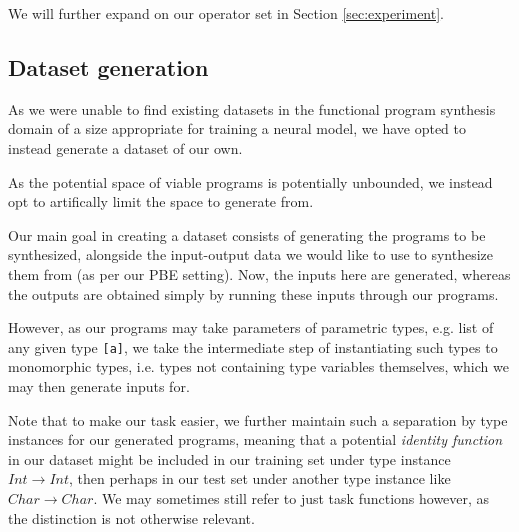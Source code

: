 \documentclass{article}
\begin{document}

We will further expand on our operator set
in Section \ref{sec:experiment}.

\subsection{Dataset generation} \label{sec:datagen}

As we were unable to find existing datasets in the functional program synthesis domain
of a size appropriate for training a neural model,
we have opted to instead generate a dataset of our own.

As the potential space of viable programs is potentially unbounded,
we instead opt to artifically limit the space to generate from.

Our main goal in creating a dataset consists of generating the programs to be synthesized,
alongside the input-output data we would like to use to synthesize them from (as per our PBE setting).
Now, the inputs here are generated, whereas the outputs are obtained simply by running these inputs through our programs.

However, as our programs may take parameters of parametric types, e.g. list of any given type \verb|[a]|,
we take the intermediate step of instantiating such types to monomorphic types,
i.e. types not containing type variables themselves,
which we may then generate inputs for.

Note that to make our task easier,
we further maintain such a separation by type instances for our generated programs,
meaning that a potential \emph{identity function} in our dataset might be
included in our training set under type instance $Int \rightarrow Int$,
then perhaps in our test set under another type instance like $Char \rightarrow Char$.
%
We may sometimes still refer to just task functions however, as the distinction is not otherwise relevant.
\end{document}
